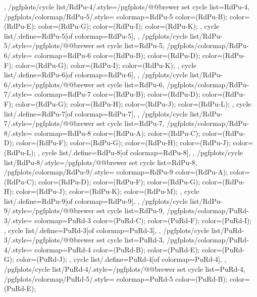 {{  },
  /pgfplots/cycle list/RdPu-4/.style={/pgfplots/@@brewer set cycle list={RdPu-4}},
  /pgfplots/colormap/RdPu-5/.style={
    colormap={RdPu-5}{
      color=(RdPu-B);
      color=(RdPu-E);
      color=(RdPu-G);
      color=(RdPu-I);
      color=(RdPu-K);
    },
    cycle list/.define={RdPu-5}{[of colormap=RdPu-5]},
  },
  /pgfplots/cycle list/RdPu-5/.style={/pgfplots/@@brewer set cycle list={RdPu-5}},
  /pgfplots/colormap/RdPu-6/.style={
    colormap={RdPu-6}{
      color=(RdPu-B);
      color=(RdPu-D);
      color=(RdPu-F);
      color=(RdPu-G);
      color=(RdPu-I);
      color=(RdPu-K);
    },
    cycle list/.define={RdPu-6}{[of colormap=RdPu-6]},
  },
  /pgfplots/cycle list/RdPu-6/.style={/pgfplots/@@brewer set cycle list={RdPu-6}},
  /pgfplots/colormap/RdPu-7/.style={
    colormap={RdPu-7}{
      color=(RdPu-B);
      color=(RdPu-D);
      color=(RdPu-F);
      color=(RdPu-G);
      color=(RdPu-H);
      color=(RdPu-J);
      color=(RdPu-L);
    },
    cycle list/.define={RdPu-7}{[of colormap=RdPu-7]},
  },
  /pgfplots/cycle list/RdPu-7/.style={/pgfplots/@@brewer set cycle list={RdPu-7}},
  /pgfplots/colormap/RdPu-8/.style={
    colormap={RdPu-8}{
      color=(RdPu-A);
      color=(RdPu-C);
      color=(RdPu-D);
      color=(RdPu-F);
      color=(RdPu-G);
      color=(RdPu-H);
      color=(RdPu-J);
      color=(RdPu-L);
    },
    cycle list/.define={RdPu-8}{[of colormap=RdPu-8]},
  },
  /pgfplots/cycle list/RdPu-8/.style={/pgfplots/@@brewer set cycle list={RdPu-8}},
  /pgfplots/colormap/RdPu-9/.style={
    colormap={RdPu-9}{
      color=(RdPu-A);
      color=(RdPu-C);
      color=(RdPu-D);
      color=(RdPu-F);
      color=(RdPu-G);
      color=(RdPu-H);
      color=(RdPu-J);
      color=(RdPu-K);
      color=(RdPu-M);
    },
    cycle list/.define={RdPu-9}{[of colormap=RdPu-9]},
  },
  /pgfplots/cycle list/RdPu-9/.style={/pgfplots/@@brewer set cycle list={RdPu-9}},
  /pgfplots/colormap/PuRd-3/.style={
    colormap={PuRd-3}{
      color=(PuRd-C);
      color=(PuRd-F);
      color=(PuRd-I);
    },
    cycle list/.define={PuRd-3}{[of colormap=PuRd-3]},
  },
  /pgfplots/cycle list/PuRd-3/.style={/pgfplots/@@brewer set cycle list={PuRd-3}},
  /pgfplots/colormap/PuRd-4/.style={
    colormap={PuRd-4}{
      color=(PuRd-B);
      color=(PuRd-E);
      color=(PuRd-G);
      color=(PuRd-J);
    },
    cycle list/.define={PuRd-4}{[of colormap=PuRd-4]},
  },
  /pgfplots/cycle list/PuRd-4/.style={/pgfplots/@@brewer set cycle list={PuRd-4}},
  /pgfplots/colormap/PuRd-5/.style={
    colormap={PuRd-5}{
      color=(PuRd-B);
      color=(PuRd-E);
}}}
